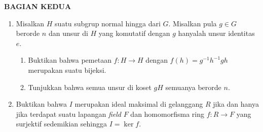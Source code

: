 \documentclass[12pt,twoside]{article}
\begin{document}
\newpage \textbf{BAGIAN KEDUA}
\begin{enumerate}
	\item Misalkan $H$ suatu subgrup normal hingga dari $G$. Misalkan pula $g \in G$ berorde $n$ dan unsur di $H$ yang komutatif dengan $g$ hanyalah unsur identitas $e$.
	      \begin{enumerate}
		      \item Buktikan bahwa pemetaan $f : H \to H$ dengan $f(h) = g^{-1}h^{-1}gh$ merupakan suatu bijeksi.
		      \item Tunjukkan bahwa semua unsur di koset $gH$ semuanya berorde $n$.
	      \end{enumerate}

	\item Buktikan bahwa $I$ merupakan ideal maksimal di gelanggang $R$ jika dan hanya jika terdapat suatu lapangan \textit{field} $F$ dan homomorfisma ring $f : R \to F$ yang surjektif sedemikian sehingga $I = \ker f$.
\end{enumerate}

\newpage
\end{document}
